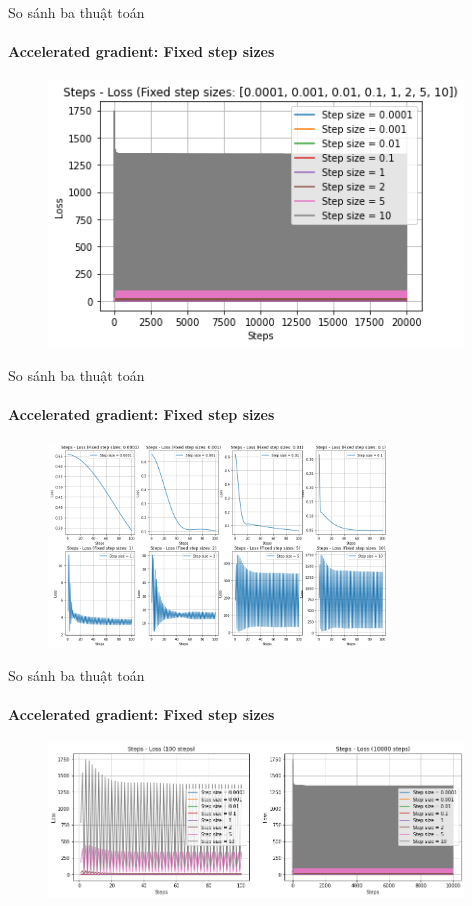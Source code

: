 \documentclass[10pt]{beamer}
\theoremstyle{remark}
\theoremstyle{definition}
\begin{document}
\begin{frame}{So sánh ba thuật toán}
	\framesubtitle{Accelerated gradient: Fixed step sizes}

	\begin{figure}[h!]
		\centering
		\includegraphics[width=11cm]{Thinh/13.png}
	\end{figure}

\end{frame}
\begin{frame}{So sánh ba thuật toán}
	\framesubtitle{Accelerated gradient: Fixed step sizes}

	\begin{figure}[h!]
		\centering
		\includegraphics[width=9cm]{Thinh/14.png}
	\end{figure}

\end{frame}
\begin{frame}{So sánh ba thuật toán}
	\framesubtitle{Accelerated gradient: Fixed step sizes}

	\begin{figure}[h!]
		\centering
		\includegraphics[width=11cm]{Thinh/15.png}
	\end{figure}

\end{frame}
\end{document}
